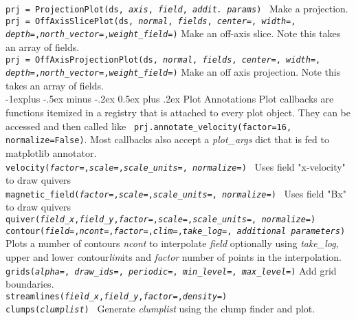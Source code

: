 \documentclass[10pt,landscape]{article}
\makeatletter
\renewcommand{\subsection}{\@startsection{subsection}{2}{0mm}%
                                {-1explus -.5ex minus -.2ex}%
                                {0.5ex plus .2ex}%
                                {\normalfont\normalsize\bfseries}}
\makeatother
\begin{document}
\begin{multicols}{3}
\texttt{prj = ProjectionPlot(ds, {\it axis}, {\it field}, {\it addit. params})} \textemdash\ Make a projection. \\
\texttt{prj = OffAxisSlicePlot(ds, {\it normal}, {\it fields}, {\it center=}, {\it width=}, {\it depth=},{\it north\_vector=},{\it weight\_field=})} \textemdash Make an off-axis slice. Note this takes an array of fields. \\
\texttt{prj = OffAxisProjectionPlot(ds, {\it normal}, {\it fields}, {\it center=}, {\it width=}, {\it depth=},{\it north\_vector=},{\it weight\_field=})} \textemdash Make an off axis projection. Note this takes an array of fields. \\

\subsection{Plot Annotations}
Plot callbacks are functions itemized in a registry that is attached to every plot object. They can be accessed and then called like \texttt{ prj.annotate\_velocity(factor=16, normalize=False)}. Most callbacks also accept a {\it plot\_args} dict that is fed to matplotlib annotator. \\
\texttt{velocity({\it factor=},{\it scale=},{\it scale\_units=}, {\it normalize=})} \textemdash\ Uses field "x-velocity" to draw quivers\\
\texttt{magnetic\_field({\it factor=},{\it scale=},{\it scale\_units=}, {\it normalize=})} \textemdash\ Uses field "Bx" to draw quivers\\
\texttt{quiver({\it field\_x},{\it field\_y},{\it factor=},{\it scale=},{\it scale\_units=}, {\it normalize=})} \\
\texttt{contour({\it field=},{\it ncont=},{\it factor=},{\it clim=},{\it take\_log=}, {\it additional parameters})} \textemdash Plots a number of contours {\it ncont} to interpolate {\it field} optionally using {\it take\_log}, upper and lower {\it c}ontour{\it lim}its and {\it factor} number of points in the interpolation.\\
\texttt{grids({\it alpha=}, {\it draw\_ids=}, {\it periodic=}, {\it min\_level=}, {\it max\_level=})} \textemdash Add grid boundaries. \\
\texttt{streamlines({\it field\_x},{\it field\_y},{\it factor=},{\it density=})}\\
\texttt{clumps({\it clumplist})} \textemdash\ Generate {\it clumplist} using the clump finder and plot. \\

\end{multicols}
\end{document}
